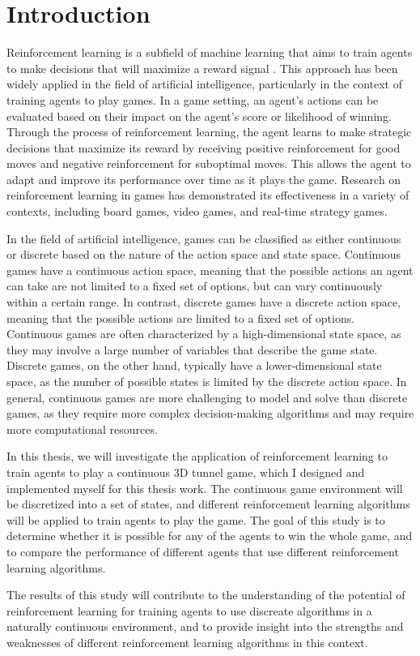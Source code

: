 \chapter*{Introduction}

Reinforcement learning is a subfield of machine learning that aims to train agents to make decisions that will maximize a reward signal \citep{RLSuttonBarto}. This approach has been widely applied in the field of artificial intelligence, particularly in the context of training agents to play games. In a game setting, an agent's actions can be evaluated based on their impact on the agent's score or likelihood of winning. Through the process of reinforcement learning, the agent learns to make strategic decisions that maximize its reward by receiving positive reinforcement for good moves and negative reinforcement for suboptimal moves. This allows the agent to adapt and improve its performance over time as it plays the game. Research on reinforcement learning in games has demonstrated its effectiveness in a variety of contexts, including board games, video games, and real-time strategy games.

In the field of artificial intelligence, games can be classified as either continuous or discrete based on the nature of the action space and state space. Continuous games have a continuous action space, meaning that the possible actions an agent can take are not limited to a fixed set of options, but can vary continuously within a certain range. In contrast, discrete games have a discrete action space, meaning that the possible actions are limited to a fixed set of options.
Continuous games are often characterized by a high-dimensional state space, as they may involve a large number of variables that describe the game state. Discrete games, on the other hand, typically have a lower-dimensional state space, as the number of possible states is limited by the discrete action space.
In general, continuous games are more challenging to model and solve than discrete games, as they require more complex decision-making algorithms and may require more computational resources.

In this thesis, we will investigate the application of reinforcement learning to train agents to play a continuous 3D tunnel game, which I designed and implemented myself for this thesis work. The continuous game environment will be discretized into a set of states, and different reinforcement learning algorithms will be applied to train agents to play the game. The goal of this study is to determine whether it is possible for any of the agents to win the whole game, and to compare the performance of different agents that use different reinforcement learning algorithms.

The results of this study will contribute to the understanding of the potential of reinforcement learning for training agents to use discreate algorithms in a naturally continuous environment, and to provide insight into the strengths and weaknesses of different reinforcement learning algorithms in this context.\